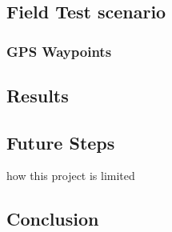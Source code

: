 \chapter{}

\section{Field Test scenario}

\subsection{GPS Waypoints}

\section{Results}

\section{Future Steps}
how this project is limited


\section{Conclusion}